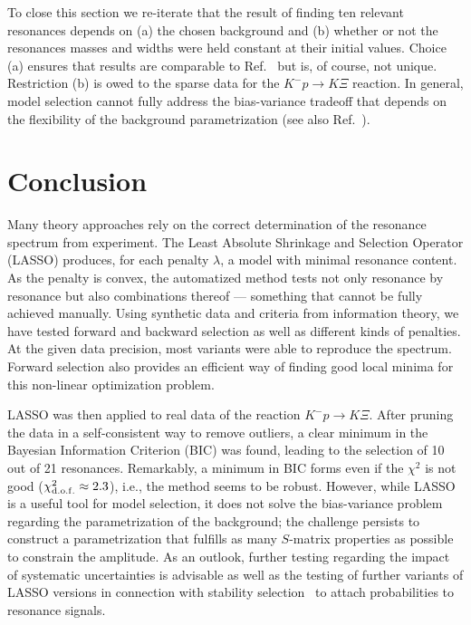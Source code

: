 \documentclass[10pt,aps,prc,superscriptaddress,twoside,twocolumn,nofootinbib,showpacs,preprintnumbers]{revtex4-1}
\begin{document}
To close this section we re-iterate that the result of finding ten relevant resonances depends on (a) the chosen background and (b) whether or not the resonances masses and widths were held constant at their initial values. Choice (a) ensures that results are comparable to Ref.~\cite{Jackson:2015dva} but is, of course, not unique. Restriction (b) is owed to the sparse data for the $K^-p\to K\Xi$ reaction. In general, 
model selection cannot fully address the bias-variance tradeoff that depends on the flexibility of the background parametrization (see also Ref.~\cite{Williams:2017gwf}). 


\section{Conclusion}
\label{sec:Conclusions}

Many theory approaches rely on the correct determination of the resonance spectrum from experiment. The Least Absolute Shrinkage and Selection Operator (LASSO) produces, for each penalty $\lambda$, a model with minimal resonance content. As the penalty is convex, the automatized method tests not only resonance by resonance but also combinations thereof --- something that cannot be fully achieved manually. Using synthetic data and criteria from information theory, we have tested forward and backward selection as well as different kinds of penalties. At the given data precision, most variants were able to reproduce the spectrum. Forward selection also provides an efficient way of finding good local minima for this non-linear optimization problem. 

LASSO was then applied to real data of the reaction $K^-p\to K\Xi$. After pruning the data in a self-consistent way to remove outliers, a clear minimum in the Bayesian Information Criterion (BIC) was found, leading to the selection of 10 out of 21 resonances. Remarkably, a minimum in BIC forms even if the $\chi^2$ is not good ($\chi^2_{\rm d.o.f.}\approx 2.3$), i.e., the method seems to be robust. However, while LASSO is a useful tool for model selection, it does not solve the bias-variance problem regarding the parametrization of the background; the challenge persists to construct a parametrization that fulfills as many $S$-matrix properties as possible  to constrain the amplitude.
As an outlook, further testing regarding the impact of systematic uncertainties is advisable as well as the testing of further variants of LASSO versions in connection with stability selection~\cite{Meinshausen2010} to attach probabilities to resonance signals. 
\end{document}
